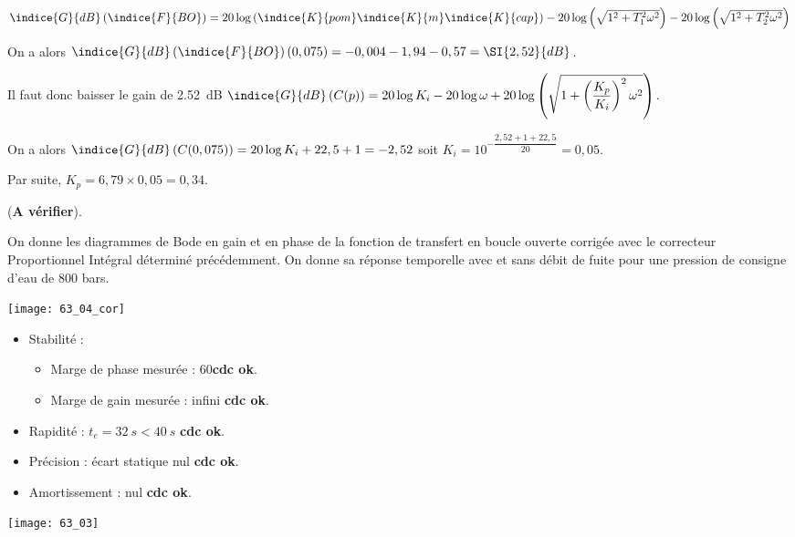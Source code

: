 $\indice{G}{dB}\left(\indice{F}{BO}\right)=20\log\left(\indice{K}{pom}\indice{K}{m}\indice{K}{cap}\right)
-20\log\left(\sqrt{1^2+T_1^2\omega^2}\right)-20\log\left(\sqrt{1^2+T_2^2\omega^2}\right)$

On a alors $\indice{G}{dB}\left(\indice{F}{BO}\right)(0,075) = -0,004-1,94-0,57=\SI{2,52}{dB}$.

Il faut donc baisser le gain de \SI{2,52}{dB}
$\indice{G}{dB}\left(C(p)\right) = 20\log K_i -20\log \omega +20\log\left(\sqrt{1+\left(\dfrac{K_p}{K_i}\right)^2\omega^2}\right) $.

On a alors $\indice{G}{dB}\left(C(0,075)\right) = 20\log K_i +22,5+1 = -2,52$ soit $K_i = 10^{-\dfrac{2,52+1+22,5}{20}  } =0,05$.

Par suite, $K_p = 6,79 \times 0,05 = 0,34$.

(\textbf{A vérifier}).

\else 

On donne les diagrammes de Bode en gain et en phase de la fonction de transfert en boucle ouverte corrigée avec le correcteur Proportionnel Intégral déterminé précédemment. On donne sa réponse temporelle avec et sans débit de fuite pour une pression de consigne d’eau de 800 bars.

\fi



\ifprof
\begin{center}
\texttt{[image: 63\_04\_cor]}
\end{center}
\begin{itemize}
\item Stabilité : 
\begin{itemize}
\item Marge de phase mesurée :  60\degres \textbf{cdc ok}.
\item Marge de gain mesurée :   infini \textbf{cdc ok}.
\end{itemize}
\item Rapidité : $ t_e = \SI{32}{s} < \SI{40}{s}$ \textbf{cdc ok}.
\item Précision :  écart statique nul \textbf{cdc ok}.
\item Amortissement :  nul \textbf{cdc ok}.
\end{itemize}
\else 
\fi

\ifprof
\else

\begin{center}
\texttt{[image: 63\_03]}
\end{center}


